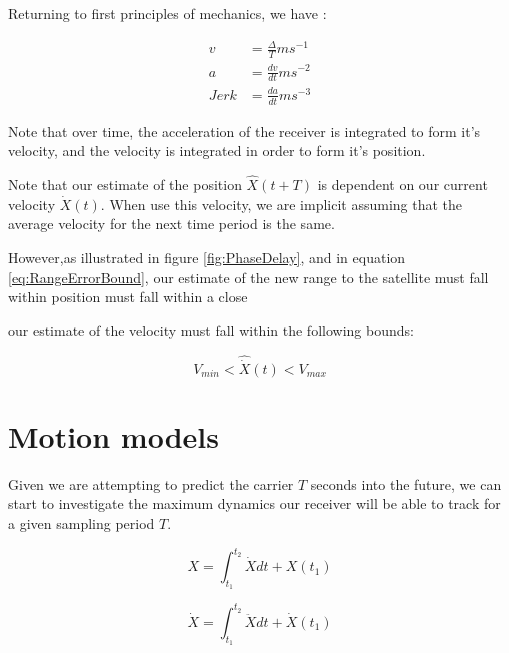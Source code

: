 Returning to first principles of mechanics, we have \cite{salas1999etgen} : 

\begin{comment}
Need to fix this up
\end{comment}

\begin{align}
v & = \frac{\Delta}{T} m s^{-1} \\
a & = \frac{dv}{dt} m s^{-2} \\
Jerk & = \frac{da}{dt} m s^{-3}
\end{align}


Note that over time, the acceleration of the receiver is integrated to form it's velocity, and the velocity is integrated in order to form it's position. 

Note that our estimate of the position $\hat{X}(t+T)$ is dependent on our current velocity $\dot{X}(t)$. When use this velocity, we are implicit assuming that the average velocity for the next time period is the same. 

However,as illustrated in figure \ref{fig:PhaseDelay}, and in equation \ref{eq:RangeErrorBound}, our estimate of the new range to the satellite must fall within 
position must fall within a close 

our estimate of the velocity must fall within the following bounds:



\begin{equation}
V_{min} < \hat{\dot{X}}(t) < V_{max}
\end{equation}





\section{Motion models}

Given we are attempting to predict the carrier $T$ seconds into the future, we can start to investigate the maximum dynamics our receiver will be able to track for a given sampling period $T$. \cite{salas1999etgen}


\begin{equation}
X = \int_{t_1}^{t_2} \dot{X} dt + X(t_1)
\label{eq:PositionIntergral}
\end{equation}

\begin{equation}
\dot{X} = \int_{t_1}^{t_2} \ddot{X} dt + \dot{X}(t_1)
\end{equation}


